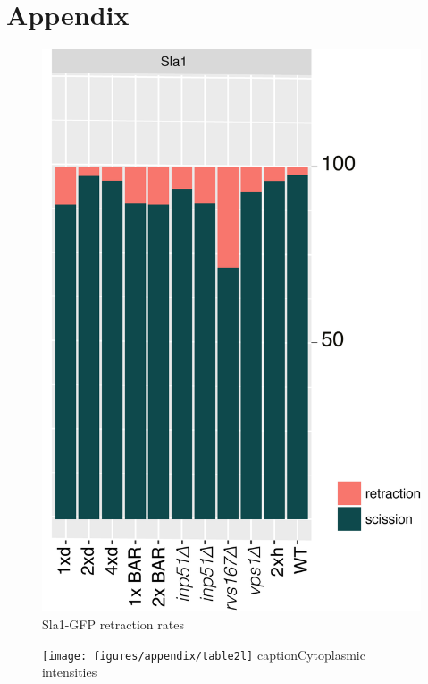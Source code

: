\chapter*{Appendix} %
\label{Ch:Appendix}

\begin{figure}[H]
\includegraphics[scale=1.5]{figures/appendix/retraction_rates_all}
\caption{Sla1-GFP retraction rates}
\end{figure}


\begin{figure}[H]
	\texttt{[image: figures/appendix/table2l]}
	caption{Cytoplasmic intensities}
\end{figure}